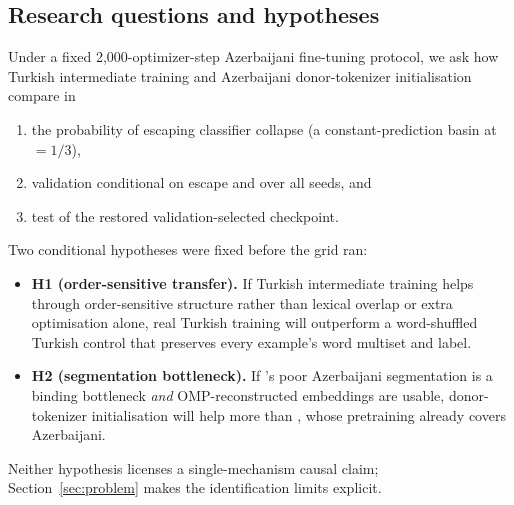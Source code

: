 \subsection{Research questions and hypotheses}
Under a fixed 2{,}000-optimizer-step Azerbaijani fine-tuning protocol, we ask how Turkish intermediate training and Azerbaijani donor-tokenizer initialisation compare in
\begin{enumerate}[label=(\roman*),leftmargin=*,nosep]
  \item the probability of escaping classifier collapse (a constant-prediction basin at \Fone{}~$=1/3$),
  \item validation \Fone{} conditional on escape and over all seeds, and
  \item test \Fone{} of the restored validation-selected checkpoint.
\end{enumerate}
Two conditional hypotheses were fixed before the grid ran:
\begin{itemize}[leftmargin=*,nosep]
  \item \textbf{H1 (order-sensitive transfer).} If Turkish intermediate training helps through order-sensitive structure rather than lexical overlap or extra optimisation alone, real Turkish training will outperform a word-shuffled Turkish control that preserves every example's word multiset and label.
  \item \textbf{H2 (segmentation bottleneck).} If \xlmxv{}'s poor Azerbaijani segmentation is a binding bottleneck \emph{and} OMP-reconstructed embeddings are usable, donor-tokenizer initialisation will help \xlmxv{} more than \xlmr{}, whose pretraining already covers Azerbaijani.
\end{itemize}
Neither hypothesis licenses a single-mechanism causal claim; Section~\ref{sec:problem} makes the identification limits explicit.

